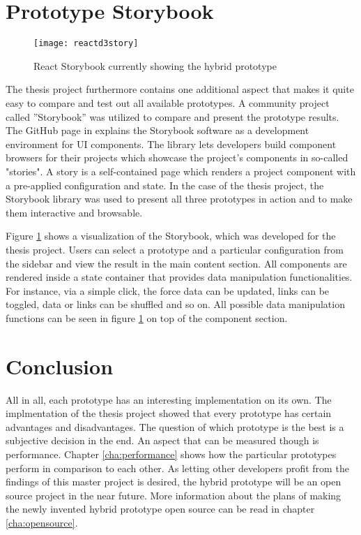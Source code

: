 \section{Prototype Storybook}

\begin{figure}
  \centering
  \texttt{[image: reactd3story]}
  \caption{React Storybook currently showing the hybrid prototype}
  \label{fig:reactD3stroy}
\end{figure}

The thesis project furthermore contains one additional aspect that makes it quite easy to compare and test out all available prototypes. A community project called ''Storybook'' was utilized to compare and present the prototype results. The GitHub page in \cite{ReactStorybook} explains the Storybook software as a development environment for UI components. The library lets developers build component browsers for their projects which showcase the project's components in so-called "stories". A story is a self-contained page which renders a project component with a pre-applied configuration and state. In the case of the thesis project, the Storybook library was used to present all three prototypes in action and to make them interactive and browsable. 

Figure \ref{fig:reactD3stroy} shows a visualization of the Storybook, which was developed for the thesis project. Users can select a prototype and a particular configuration from the sidebar and view the result in the main content section. All components are rendered inside a state container that provides data manipulation functionalities. For instance, via a simple click, the force data can be updated, links can be toggled, data or links can be shuffled and so on. All possible data manipulation functions can be seen in figure \ref{fig:reactD3stroy} on top of the component section.

\section{Conclusion}

All in all, each prototype has an interesting implementation on its own. The implmentation of the thesis project showed that every prototype has certain advantages and disadvantages. The question of which prototype is the best is a subjective decision in the end. An aspect that can be measured though is performance. Chapter \ref{cha:performance} shows how the particular prototypes perform in comparison to each other. As letting other developers profit from the findings of this master project is desired, the hybrid prototype will be an open source project in the near future. More information about the plans of making the newly invented hybrid prototype open source can be read in chapter \ref{cha:opensource}.